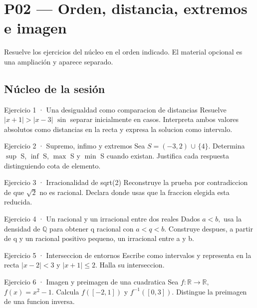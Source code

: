 \documentclass[10pt,a4paper,oneside,openany]{book}
\begin{document}
\chapter{P02 — Orden, distancia, extremos e imagen}
Resuelve los ejercicios del núcleo en el orden indicado. El material opcional es una ampliación y aparece separado.
\section*{Núcleo de la sesión}
\begin{PSevenExerciseFixed}{Ejercicio 1 · Una desigualdad como comparacion de distancias}
Resuelve \(|x+1|>|x-3|\) \(\sin\) separar inicialmente en casos. Interpreta ambos valores absolutos como distancias en la recta y expresa la solucion como intervalo.
\end{PSevenExerciseFixed}
\begin{PSevenExerciseFixed}{Ejercicio 2 · Supremo, infimo y extremos}
Sea \(S=(-3,2)\) \(\cup \) \(\{4\}\). Determina \(\sup\) S, \(\inf\) S, \(\max\) S y \(\min\) S cuando existan. Justifica cada respuesta distinguiendo cota de elemento.
\end{PSevenExerciseFixed}
\begin{PSevenExerciseFixed}{Ejercicio 3 · Irracionalidad de sqrt(2)}
Reconstruye la prueba por contradiccion de que \(\sqrt{2}\) no es racional. Declara donde usas que la fraccion elegida esta reducida.
\end{PSevenExerciseFixed}
\begin{PSevenExerciseFixed}{Ejercicio 4 · Un racional y un irracional entre dos reales}
Dados \(a<b,\) usa la densidad de \(\mathbb{Q}\) para obtener q racional con \(a<q<b\). Construye despues, a partir de q y un racional positivo pequeno, un irracional entre a y b.
\end{PSevenExerciseFixed}
\begin{PSevenExerciseFixed}{Ejercicio 5 · Interseccion de entornos}
Escribe como intervalos y representa en la recta \(|x-2|<3\) y \(|x+1|\le 2\). Halla su interseccion.
\end{PSevenExerciseFixed}
\begin{PSevenExerciseFixed}{Ejercicio 6 · Imagen y preimagen de una cuadratica}
Sea \(f:\mathbb{R}\to \mathbb{R},\) \(f(x)=x^{2}-1\). Calcula \(f([-2,1])\) y \(f^{-1}([0,3])\). Distingue la preimagen de una funcion inversa.
\end{PSevenExerciseFixed}
\end{document}

